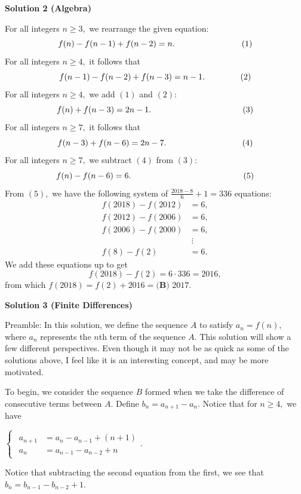 \begin{enumerate}
 



\textbf{Solution 2 (Algebra)}

For all integers $n\geq3,$ we rearrange the given equation: 
 \[f(n)-f(n-1)+f(n-2)=n. \hspace{28.25mm}(1)\]For all integers $n\geq4,$ it follows that 
 \[f(n-1)-f(n-2)+f(n-3)=n-1. \hspace{15mm}(2)\]For all integers $n\geq4,$ we add $(1)$ and $(2):$ 
 \[f(n)+f(n-3)=2n-1. \hspace{38.625mm}(3)\]For all integers $n\geq7,$ it follows that 
 \[f(n-3)+f(n-6)=2n-7. \hspace{32mm}(4)\]For all integers $n\geq7,$ we subtract $(4)$ from $(3):$ 
 \[f(n)-f(n-6)=6. \hspace{47.5mm}(5)\]From $(5),$ we have the following system of $\frac{2018-8}{6}+1=336$ equations:
 \begin{align*} f(2018)-f(2012)&=6, \\ f(2012)-f(2006)&=6, \\ f(2006)-f(2000)&=6, \\ & \ \vdots \\ f(8)-f(2)&=6. \end{align*}
We add these equations up to get 
 \[f(2018)-f(2)=6\cdot336=2016,\] from which $f(2018)=f(2)+2016=\boxed{\textbf{(B) } 2017}.$




\textbf{Solution 3 (Finite Differences)}

Preamble: In this solution, we define the sequence $A$ to satisfy $a_n = f(n),$ where $a_n$ represents the $n$th term of the sequence $A.$ This solution will show a few different perspectives. Even though it may not be as quick as some of the solutions above, I feel like it is an interesting concept, and may be more motivated. 

 To begin, we consider the sequence $B$ formed when we take the difference of consecutive terms between $A.$ Define $b_n = a_{n+1} - a_n.$ Notice that for $n \ge 4,$ we have 

 $\begin{cases}\begin{aligned} a_{n+1} &= a_{n} - a_{n-1} + (n+1) \\ a_{n} &= a_{n-1} - a_{n-2} + n \end{aligned}.\end{cases}$

  Notice that subtracting the second equation from the first, we see that $b_{n} = b_{n-1} - b_{n-2} + 1.$ 


\end{enumerate}
